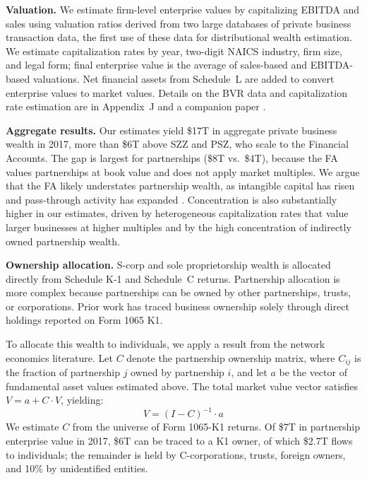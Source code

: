 \documentclass[12pt]{article}
\newcommand{\be}{\begin{equation}}
\newcommand{\ee}{\end{equation}}
\begin{document}
\textbf{Valuation.} We estimate firm-level enterprise values by capitalizing EBITDA and sales using valuation ratios derived from two large databases of private business transaction data, the first use of these data for distributional wealth estimation. We estimate capitalization rates by year, two-digit NAICS industry, firm size, and legal form; final enterprise value is the average of sales-based and EBITDA-based valuations. Net financial assets from Schedule~L are added to convert enterprise values to market values. Details on the BVR data and capitalization rate estimation are in Appendix~J and a companion paper \citep{campbell2025value}.

\textbf{Aggregate results.} Our estimates yield \$17T in aggregate private business wealth in 2017, more than \$6T above SZZ and PSZ, who scale to the Financial Accounts. The gap is largest for partnerships (\$8T vs.\ \$4T), because the FA values partnerships at book value and does not apply market multiples. We argue that the FA likely understates partnership wealth, as intangible capital has risen \citep{bhandari2021sweat,corrado2009intangible} and pass-through activity has expanded \citep{smith2019capitalists,smith2022rise}. Concentration is also substantially higher in our estimates, driven by heterogeneous capitalization rates that value larger businesses at higher multiples and by the high concentration of indirectly owned partnership wealth.

\textbf{Ownership allocation.} S-corp and sole proprietorship wealth is allocated directly from Schedule K-1 and Schedule~C returns. Partnership allocation is more complex because partnerships can be owned by other partnerships, trusts, or corporations. Prior work has traced business ownership solely through direct holdings reported on Form 1065 K1. 

To allocate this wealth to individuals, we apply a result from the network economics literature. Let $C$ denote the partnership ownership matrix, where $C_{ij}$ is the fraction of partnership $j$ owned by partnership $i$, and let $a$ be the vector of fundamental asset values estimated above. The total market value vector satisfies $V = a + C \cdot V$, yielding:
\be
V = (I - C)^{-1} \cdot a
\label{eq:network}
\ee
We estimate $C$ from the universe of Form 1065-K1 returns. Of \$7T in partnership enterprise value in 2017, \$6T can be traced to a K1 owner, of which \$2.7T flows to individuals; the remainder is held by C-corporations, trusts, foreign owners, and 10\% by unidentified entities. 
\end{document}
